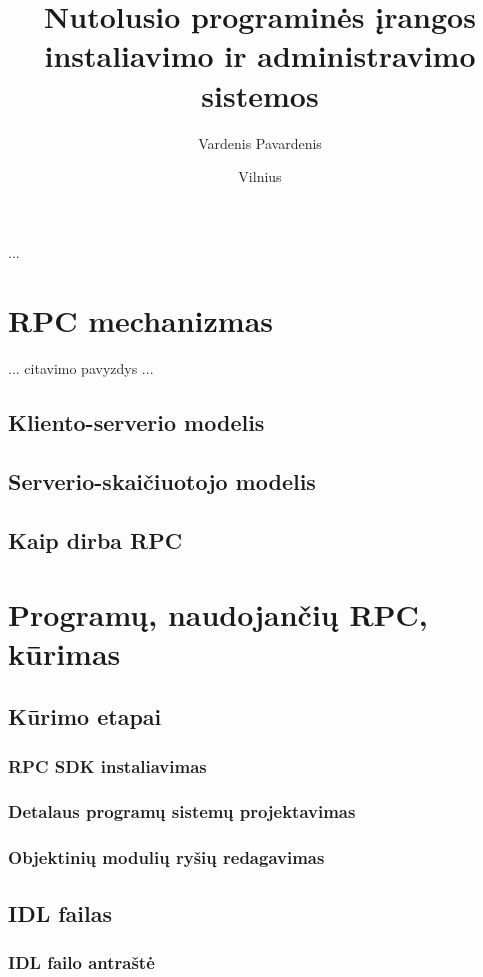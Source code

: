 \documentclass[12pt, a4paper, lithuanian]{article}
\title{Nutolusio programinės įrangos instaliavimo ir administravimo sistemos}
\author{Vardenis Pavardenis}
\date{Vilnius\\ \the\year}
\begin{document}
\sloppy
\maketitle

\tableofcontents

...

\section{RPC mechanizmas}
... citavimo pavyzdys \cite{Banerjee1997} ...

\subsection{Kliento-serverio modelis}
\subsection{Serverio-skaičiuotojo modelis}
\subsection{Kaip dirba RPC}

\section{Programų, naudojančių RPC, kūrimas}
\subsection{Kūrimo etapai}
\subsubsection{RPC SDK instaliavimas}
\subsubsection{Detalaus programų sistemų projektavimas}
\subsubsection{Objektinių modulių ryšių redagavimas}
\subsection{IDL failas}
\subsubsection{IDL failo antraštė}
\end{document}

